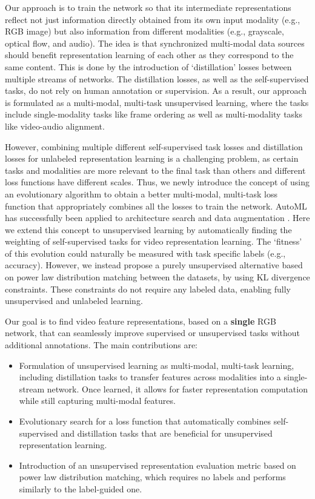 \documentclass[10pt,twocolumn,letterpaper]{article}
\begin{document}
Our approach is to train the network so that its intermediate representations reflect not just information directly obtained from its own input modality (e.g., RGB image) but also information from different modalities (e.g., grayscale, optical flow, and audio). The idea is that synchronized multi-modal data sources should benefit representation learning of each other as they correspond to the same content.
This is done by the introduction of `distillation' \cite{hinton2015distilling} losses between multiple streams of networks. The distillation losses, as well as the self-supervised tasks, do not rely on human annotation or supervision. As a result, our approach is formulated as a multi-modal, multi-task unsupervised learning, where the tasks include single-modality tasks like frame ordering as well as multi-modality tasks like video-audio alignment.

However, combining multiple different self-supervised task losses and distillation losses for unlabeled representation learning is a challenging problem, as
certain tasks and modalities are more relevant to the final task than others and different loss functions have different scales.
Thus, we newly introduce the concept of using an evolutionary algorithm to obtain a better multi-modal, multi-task loss function that appropriately combines all the losses to train the network. AutoML has successfully been applied to architecture search \cite{liu2018progressive} and data augmentation \cite{cubuk2018autoaugment}. Here we extend this concept to unsupervised learning by automatically finding the weighting of self-supervised tasks for video representation learning. 
The `fitness' of this evolution could naturally be measured with task specific labels (e.g., accuracy). However, we instead propose a purely unsupervised alternative based on power law distribution matching between the datasets, by using KL divergence constraints. These constraints do not require any labeled data, enabling fully unsupervised and unlabeled learning.


Our goal is to find video feature representations, based on a \textbf{single} RGB network, that can seamlessly improve supervised or unsupervised tasks without additional annotations. The main contributions are:

\begin{itemize}[nosep,leftmargin=*]
  \item Formulation of unsupervised learning as multi-modal, multi-task learning, including distillation tasks to transfer features across modalities into a single-stream network. Once learned, it allows for faster representation computation while still capturing multi-modal features.
\item Evolutionary search for a loss function that automatically combines self-supervised and distillation tasks that are beneficial for unsupervised representation learning.
  \item Introduction of an unsupervised representation evaluation metric based on power law distribution matching, which requires no labels and performs similarly to the label-guided one.
\end{itemize}
\end{document}
